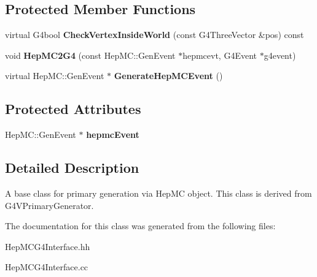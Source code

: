 \subsection*{Protected Member Functions}
\begin{DoxyCompactItemize}
\item 
\hypertarget{class_hep_m_c_g4_interface_aa6506443875a8f04967dc28f0941bedf}{}virtual G4bool {\bfseries Check\+Vertex\+Inside\+World} (const G4\+Three\+Vector \&pos) const \label{class_hep_m_c_g4_interface_aa6506443875a8f04967dc28f0941bedf}

\item 
\hypertarget{class_hep_m_c_g4_interface_a40b29a7630cc2aa89f16a6ef104a03b6}{}void {\bfseries Hep\+M\+C2\+G4} (const Hep\+M\+C\+::\+Gen\+Event $\ast$hepmcevt, G4\+Event $\ast$g4event)\label{class_hep_m_c_g4_interface_a40b29a7630cc2aa89f16a6ef104a03b6}

\item 
\hypertarget{class_hep_m_c_g4_interface_a5f04579412ea7f076b319e209d048c07}{}virtual Hep\+M\+C\+::\+Gen\+Event $\ast$ {\bfseries Generate\+Hep\+M\+C\+Event} ()\label{class_hep_m_c_g4_interface_a5f04579412ea7f076b319e209d048c07}

\end{DoxyCompactItemize}
\subsection*{Protected Attributes}
\begin{DoxyCompactItemize}
\item 
\hypertarget{class_hep_m_c_g4_interface_af25ddb31c0fd20eaa528c42c74a57361}{}Hep\+M\+C\+::\+Gen\+Event $\ast$ {\bfseries hepmc\+Event}\label{class_hep_m_c_g4_interface_af25ddb31c0fd20eaa528c42c74a57361}

\end{DoxyCompactItemize}


\subsection{Detailed Description}
A base class for primary generation via Hep\+M\+C object. This class is derived from G4\+V\+Primary\+Generator. 

The documentation for this class was generated from the following files\+:\begin{DoxyCompactItemize}
\item 
Hep\+M\+C\+G4\+Interface.\+hh\item 
Hep\+M\+C\+G4\+Interface.\+cc\end{DoxyCompactItemize}
